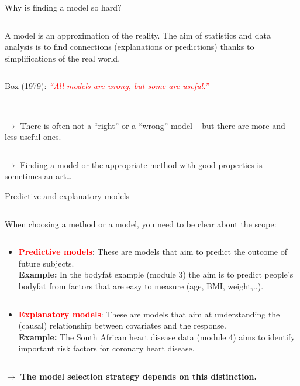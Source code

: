 \documentclass[10pt,ignorenonframetext,]{beamer}
\providecommand{\tightlist}{%
  \setlength{\itemsep}{0pt}\setlength{\parskip}{0pt}}
\begin{document}
\begin{frame}

\begin{block}{Why is finding a model so hard?}

\(~\)

A model is an approximation of the reality. The aim of statistics and
data analysis is to find connections (explanations or predictions)
thanks to simplifications of the real world.

\(~\)

Box (1979):
\emph{\textcolor{red}{``All models are wrong, but some are useful.''}}

\(~\) \(~\)

\(\rightarrow\) There is often not a ``right'' or a ``wrong'' model --
but there are more and less useful ones.

\(~\)

\(\rightarrow\) Finding a model or the appropriate method with good
properties is sometimes an art\ldots{}

\end{block}

\end{frame}

\begin{frame}

\begin{block}{Predictive and explanatory models}

\(~\)

When choosing a method or a model, you need to be clear about the scope:

\(~\)

\begin{itemize}
\tightlist
\item
  \textbf{\textcolor{red}{Predictive models}}: These are models that aim
  to predict the outcome of future subjects. \vspace{2mm}\\
  \textbf{Example:} In the bodyfat example (module 3) the aim is to
  predict people's bodyfat from factors that are easy to measure (age,
  BMI, weight,..).
\end{itemize}

\(~\)

\begin{itemize}
\tightlist
\item
  \textbf{\textcolor{red}{Explanatory models}}: These are models that
  aim at understanding the (causal) relationship between covariates and
  the response. \vspace{2mm}\\
  \textbf{Example:} The South African heart disease data (module 4) aims
  to identify important risk factors for coronary heart disease.
\end{itemize}

\(~\)

\(\rightarrow\) \textbf{The model selection strategy depends on this
distinction.}

\end{block}

\end{frame}
\end{document}
